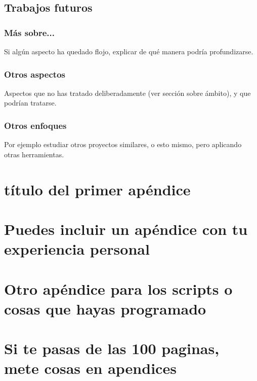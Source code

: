 \documentclass[a4paper, 12pt]{book}
\begin{document}
\section{Trabajos futuros}
\label{sec:future}

\subsection{Más sobre...}

Si algún aspecto ha quedado flojo, explicar de qué manera podría profundizarse.

\subsection{Otros aspectos}

Aspectos que no has tratado deliberadamente (ver sección sobre ámbito), y que podrían tratarse.


\subsection{Otros enfoques}

Por ejemplo estudiar otros proyectos similares, o esto mismo, pero aplicando otras herramientas.


\appendix

\chapter{título del primer apéndice}

\chapter{Puedes incluir un apéndice con tu experiencia personal}

\chapter{Otro apéndice para los scripts o cosas que hayas programado}

\chapter{Si te pasas de las 100 paginas, mete cosas en apendices}






\label{Bibliography}
\end{document}

